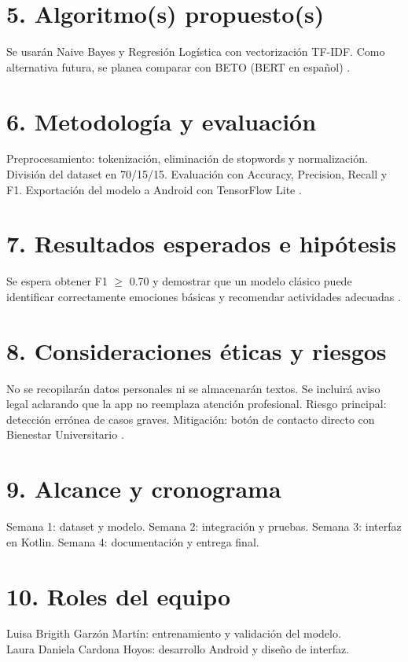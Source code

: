 \documentclass[11pt,letterpaper]{article}
\begin{document}
\section*{5. Algoritmo(s) propuesto(s)}
Se usarán Naive Bayes y Regresión Logística con vectorización TF-IDF. Como alternativa futura, se planea comparar con BETO (BERT en español) \cite{jurafsky2023speech,gutierrez2021emociones}.

\section*{6. Metodología y evaluación}
Preprocesamiento: tokenización, eliminación de stopwords y normalización. División del dataset en 70/15/15. Evaluación con Accuracy, Precision, Recall y F1. Exportación del modelo a Android con TensorFlow Lite \cite{tensorflowlite2023}.

\section*{7. Resultados esperados e hipótesis}
Se espera obtener F1 $\geq$ 0.70 y demostrar que un modelo clásico puede identificar correctamente emociones básicas y recomendar actividades adecuadas \cite{smith2022mentalhealth}.

\section*{8. Consideraciones éticas y riesgos}
No se recopilarán datos personales ni se almacenarán textos. Se incluirá aviso legal aclarando que la app no reemplaza atención profesional. Riesgo principal: detección errónea de casos graves. Mitigación: botón de contacto directo con Bienestar Universitario \cite{who2022mental}.

\section*{9. Alcance y cronograma}
Semana 1: dataset y modelo. Semana 2: integración y pruebas. Semana 3: interfaz en Kotlin. Semana 4: documentación y entrega final.

\section*{10. Roles del equipo}
Luisa Brigith Garzón Martín: entrenamiento y validación del modelo.\\
Laura Daniela Cardona Hoyos: desarrollo Android y diseño de interfaz.

\printbibliography[title={Referencias}]
\end{document}
